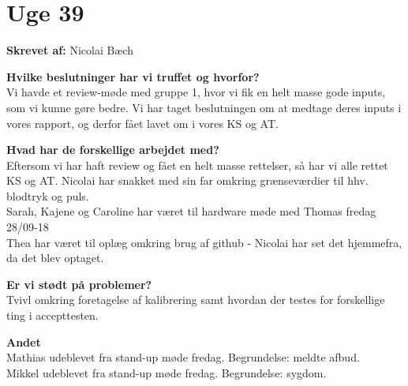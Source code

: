 \section{Uge 39}
\textbf{Skrevet af:} 
Nicolai Bæch

\textbf{Hvilke beslutninger har vi truffet og hvorfor? } \\
Vi havde et review-møde med gruppe 1, hvor vi fik en helt masse gode inputs, som vi kunne gøre bedre. Vi har taget beslutningen om at medtage deres inputs i vores rapport, og derfor fået lavet om i vores KS og AT.

\textbf{Hvad har de forskellige arbejdet med? } \\
Eftersom vi har haft review og fået en helt masse rettelser, så har vi alle rettet KS og AT.
Nicolai har snakket med sin far omkring grænseværdier til hhv. blodtryk og puls. \\
Sarah, Kajene og Caroline har været til hardware møde med Thomas fredag 28/09-18 \\
Thea har været til oplæg omkring brug af github - Nicolai har set det hjemmefra, da det blev optaget.

\textbf{Er vi stødt på problemer? } \\
Tvivl omkring foretagelse af kalibrering samt hvordan der testes for forskellige ting i accepttesten.

\textbf{Andet} \\
Mathias udeblevet fra stand-up møde fredag. Begrundelse: meldte afbud. \\
Mikkel udeblevet fra stand-up møde fredag. Begrundelse: sygdom.

\clearpage